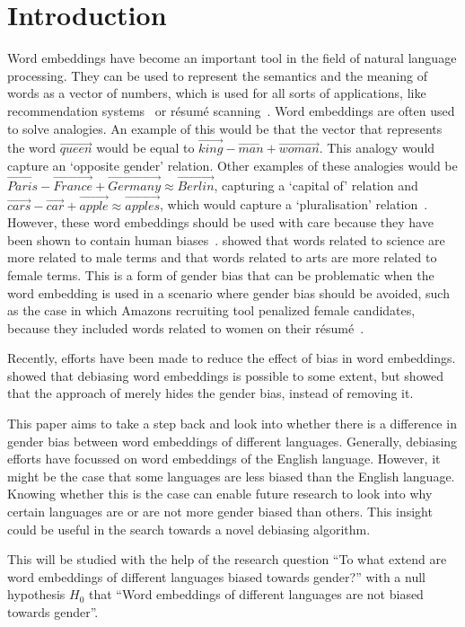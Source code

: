 \section{Introduction}
Word embeddings have become an important tool in the field of natural language
processing. They can be used to represent the semantics and the meaning of
words as a vector of numbers, which is used for all sorts of applications, like
recommendation systems~\parencite{10.1145/3219819.3219885} or résumé
scanning~\parencite{large-scale-hoang-2017}. Word
embeddings are often used to solve analogies. An example of this would be that the
vector that represents the word
$\overrightarrow{queen}$ would be equal to $\overrightarrow{king} -
\overrightarrow{man} +
\overrightarrow{woman}$. This analogy would capture an `opposite gender' relation.
Other examples of these analogies would be $\overrightarrow{Paris} -
\overrightarrow{France} + \overrightarrow{Germany} \approx \overrightarrow{Berlin}$,
capturing a `capital of' relation and
$\overrightarrow{cars} - \overrightarrow{car} + \overrightarrow{apple} \approx
\overrightarrow{apples}$, which would capture a `pluralisation' relation~\parencite{vylomova-etal-2016-take}.
However, these word embeddings should be used with care because they have been
shown to contain human
biases~\parencite{caliskan_2017_semantics_language_corpora}.
\textcite{caliskan_2017_semantics_language_corpora} showed
that words related to science are more related to male terms and that
words related to arts are more related to female terms. This is a form of gender bias
that can be problematic when the word embedding is used in a scenario where gender bias
should be avoided, such as
the case in which Amazons recruiting tool penalized female candidates, because they
included words related to women on their résumé~\parencite{dastin_2018}.

Recently, efforts have been made to reduce the effect of bias in word embeddings.
\textcite{bolukbasi_2016_quantifying_stereotypes} showed that debiasing word embeddings
is possible to some extent, but \textcite{gonen-goldberg-2019-lipstick-pig} showed that
the approach of \textcite{bolukbasi_2016_quantifying_stereotypes} merely hides the
gender bias, instead of removing it.

This paper aims to take a step back and look into whether there is a difference in gender
bias between word embeddings of different languages. Generally, debiasing efforts
have focussed on word embeddings of the English language. However, it might be the
case that some languages are less biased than the English language. Knowing whether this
is the case can enable future research to look into why certain languages are or are not
more gender biased than others. This insight could be useful in the search towards a novel
debiasing algorithm.

This will be studied with the help of the research question ``To what extend are word
embeddings of different languages biased towards gender?'' with a null hypothesis $H_0$
that ``Word embeddings of different languages are not biased towards gender''.
